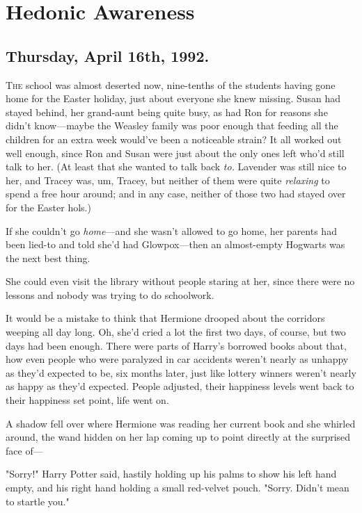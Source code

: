 \chapter{Hedonic Awareness}

\section{Thursday, April 16th, 1992.}

\lettrine{T}{he} school was almost deserted now, nine-tenths of the students having gone
home for the Easter holiday, just about everyone she knew missing. Susan had
stayed behind, her grand-aunt being quite busy, as had Ron for reasons she
didn't know---maybe the Weasley family was poor enough that feeding all the
children for an extra week would've been a noticeable strain? It all worked out
well enough, since Ron and Susan were just about the only ones left who'd still
talk to her. (At least that she wanted to talk back \emph{to.} Lavender was
still nice to her, and Tracey was, um, Tracey, but neither of them were quite
\emph{relaxing} to spend a free hour around; and in any case, neither of those
two had stayed over for the Easter hols.)

If she couldn't go \emph{home}---and she wasn't allowed to go home, her parents
had been lied-to and told she'd had Glowpox---then an almost-empty Hogwarts was
the next best thing.

She could even visit the library without people staring at her, since there
were no lessons and nobody was trying to do schoolwork.

It would be a mistake to think that Hermione drooped about the corridors
weeping all day long. Oh, she'd cried a lot the first two days, of course, but
two days had been enough. There were parts of Harry's borrowed books about
that, how even people who were paralyzed in car accidents weren't nearly as
unhappy as they'd expected to be, six months later, just like lottery winners
weren't nearly as happy as they'd expected. People adjusted, their happiness
levels went back to their happiness set point, life went on.

A shadow fell over where Hermione was reading her current book and she whirled
around, the wand hidden on her lap coming up to point directly at the surprised
face of---

"Sorry!" Harry Potter said, hastily holding up his palms to show his left hand
empty, and his right hand holding a small red-velvet pouch. "Sorry. Didn't mean
to startle you."

